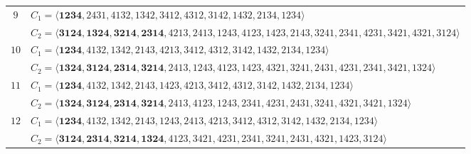 \documentclass[12pt,a4paper]{amsart}
\theoremstyle{definition}
\begin{document}
\begin{table}[htbp]
\begin{adjustbox}{angle=90,max height=\textheight}
\begin{minipage}{\textheight}
\begin{tabular}{@{}c l@{}}
$9$ &
$C_1=\langle\mathbf{1234},2431,4132,1342,3412,4312,3142,1432,2134,1234\rangle$\\
&
$C_2=\langle\mathbf{3124,1324,3214,2314},4213,2413,1243,4123,1423,2143,3241,2341,4231,3421,4321,3124\rangle$
\\\midrule

$10$ &
$C_1=\langle\mathbf{1234},4132,1342,2143,4213,3412,4312,3142,1432,2134,1234\rangle$\\
&
$C_2=\langle\mathbf{1324,3124,2314,3214},2413,1243,4123,1423,4321,3241,2431,4231,2341,3421,1324\rangle$
\\\midrule

$11$ &
$C_1=\langle\mathbf{1234},4132,1342,2143,1423,4213,3412,4312,3142,1432,2134,1234\rangle$\\
&
$C_2=\langle\mathbf{1324,3124,2314,3214},2413,4123,1243,2341,4231,2431,3241,4321,3421,1324\rangle$
\\\midrule

$12$ &
$C_1=\langle\mathbf{1234},4132,1342,2143,1243,2413,4213,3412,4312,3142,1432,2134,1234\rangle$\\
&
$C_2=\langle\mathbf{3124,2314,3214,1324},4123,3421,4231,2341,3241,2431,4321,1423,3124\rangle$
\\

\bottomrule
\end{tabular}

\end{minipage} %
\end{adjustbox}
\end{table}
\end{document}
